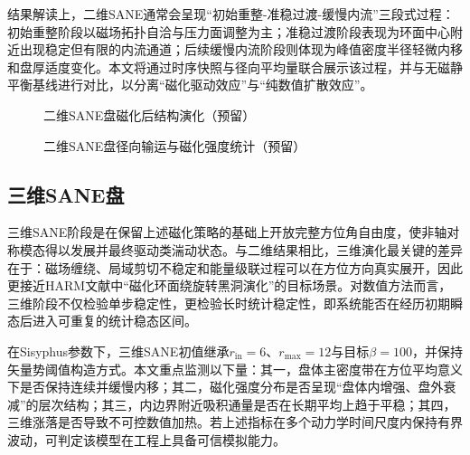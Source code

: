 结果解读上，二维SANE通常会呈现“初始重整-准稳过渡-缓慢内流”三段式过程：初始重整阶段以磁场拓扑自洽与压力面调整为主；准稳过渡阶段表现为环面中心附近出现稳定但有限的内流通道；后续缓慢内流阶段则体现为峰值密度半径轻微内移和盘厚适度变化。本文将通过时序快照与径向平均量联合展示该过程，并与无磁静平衡基线进行对比，以分离“磁化驱动效应”与“纯数值扩散效应”。

\begin{figure}[htbp]
	\centering
	\caption{二维SANE盘磁化后结构演化（预留）}
	\label{fig:fm-2d-sane-map-placeholder}
\end{figure}

\begin{figure}[htbp]
	\centering
	\caption{二维SANE盘径向输运与磁化强度统计（预留）}
	\label{fig:fm-2d-sane-radial-placeholder}
\end{figure}

\subsection{三维SANE盘}
三维SANE阶段是在保留上述磁化策略的基础上开放完整方位角自由度，使非轴对称模态得以发展并最终驱动类湍动状态。与二维结果相比，三维演化最关键的差异在于：磁场缠绕、局域剪切不稳定和能量级联过程可以在方位方向真实展开，因此更接近HARM文献中“磁化环面绕旋转黑洞演化”的目标场景。对数值方法而言，三维阶段不仅检验单步稳定性，更检验长时统计稳定性，即系统能否在经历初期瞬态后进入可重复的统计稳态区间。

在Sisyphus参数下，三维SANE初值继承$ r_{\mathrm{in}}=6 $、$ r_{\max}=12 $与目标$\beta=100$，并保持矢量势阈值构造方式。本文重点监测以下量：其一，盘体主密度带在方位平均意义下是否保持连续并缓慢内移；其二，磁化强度分布是否呈现“盘体内增强、盘外衰减”的层次结构；其三，内边界附近吸积通量是否在长期平均上趋于平稳；其四，三维涨落是否导致不可控数值加热。若上述指标在多个动力学时间尺度内保持有界波动，可判定该模型在工程上具备可信模拟能力。

